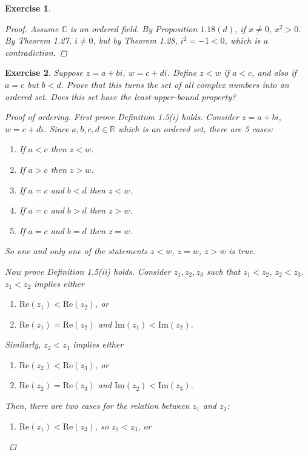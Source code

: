 \documentclass[10pt,letterpaper]{amsart}
\newtheorem{exercise}{Exercise}[section]
\theoremstyle{definition}
\theoremstyle{remark}
\numberwithin{equation}{exercise}
\begin{document}
\begin{multicols}{2}
\begin{exercise}
\begin{proof}
      Assume $\mathbb{C}$ is an ordered field. By Proposition $1.18(d)$, if $x \ne 0$, $x^2 > 0$. By Theorem 1.27, $i \ne 0$, but by Theorem 1.28, $i^2 = -1 < 0$, which is a contradiction.
    \end{proof}
  \end{exercise}
  \begin{exercise}\label{1.9}
    Suppose $z = a+bi$, $w = c+di$. Define $z < w$ if $a < c$, and also if $a = c$ but $b < d$. Prove that this turns the set of all complex numbers into an ordered set. Does this set have the least-upper-bound property?
    \begin{proof}[Proof of ordering]
      First prove Definition 1.5(i) holds. Consider $z = a+bi$, $w = c+di$. Since $a,b,c,d \in \mathbb{R}$ which is an ordered set, there are 5 cases:
      \begin{enumerate}
        \item If $a < c$ then $z < w$.
        \item If $a > c$ then $z > w$.
        \item If $a = c$ and $b < d$ then $z < w$. 
        \item If $a = c$ and $b > d$ then $z > w$.
        \item If $a=c$ and $b=d$ then $z = w$. 
      \end{enumerate}
      So one and only one of the statements $z < w$, $z = w$, $z > w$ is true.
      \par Now prove Definition 1.5(ii) holds. Consider $z_1,z_2,z_3$ such that $z_1 < z_2$, $z_2 < z_3$. $z_1 < z_2$ implies either 
      \begin{enumerate}
        \item $\text{Re}(z_1) < \text{Re}(z_2)$, or
        \item $\text{Re}(z_1) = \text{Re}(z_2)$ and $\text{Im}(z_1) < \text{Im}(z_2)$.
      \end{enumerate}
      Similarly, $z_2 < z_3$ implies either
      \begin{enumerate}
        \item $\text{Re}(z_2) < \text{Re}(z_3)$, or
        \item $\text{Re}(z_2) = \text{Re}(z_3)$ and $\text{Im}(z_2) < \text{Im}(z_3)$.
      \end{enumerate}
      Then, there are two cases for the relation between $z_1$ and $z_3$:
      \begin{enumerate}
        \item $\text{Re}(z_1) < \text{Re}(z_3)$, so $z_1 < z_3$, or

\end{enumerate}
\end{proof}
\end{exercise}
\end{multicols}
\end{document}
